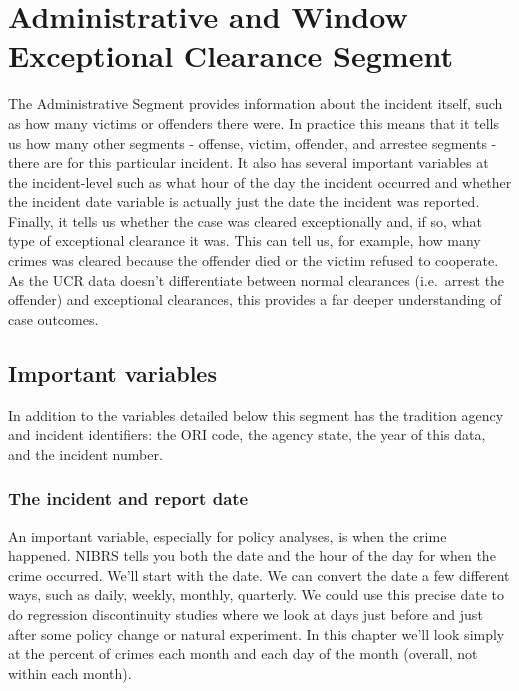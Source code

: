 \documentclass[
  12pt,
  openany]{book}
\begin{document}
\hypertarget{administrative-and-window-exceptional-clearance-segment}{%
\chapter{Administrative and Window Exceptional Clearance Segment}\label{administrative-and-window-exceptional-clearance-segment}}

The Administrative Segment provides information about the incident itself, such as how many victims or offenders there were. In practice this means that it tells us how many other segments - offense, victim, offender, and arrestee segments - there are for this particular incident. It also has several important variables at the incident-level such as what hour of the day the incident occurred and whether the incident date variable is actually just the date the incident was reported. Finally, it tells us whether the case was cleared exceptionally and, if so, what type of exceptional clearance it was. This can tell us, for example, how many crimes was cleared because the offender died or the victim refused to cooperate. As the UCR data doesn't differentiate between normal clearances (i.e.~arrest the offender) and exceptional clearances, this provides a far deeper understanding of case outcomes.

\hypertarget{important-variables}{%
\section{Important variables}\label{important-variables}}

In addition to the variables detailed below this segment has the tradition agency and incident identifiers: the ORI code, the agency state, the year of this data, and the incident number.

\hypertarget{the-incident-and-report-date}{%
\subsection{The incident and report date}\label{the-incident-and-report-date}}

An important variable, especially for policy analyses, is when the crime happened. NIBRS tells you both the date and the hour of the day for when the crime occurred. We'll start with the date. We can convert the date a few different ways, such as daily, weekly, monthly, quarterly. We could use this precise date to do regression discontinuity studies where we look at days just before and just after some policy change or natural experiment. In this chapter we'll look simply at the percent of crimes each month and each day of the month (overall, not within each month).
\end{document}
